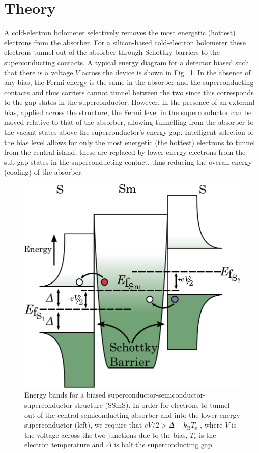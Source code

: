 \documentclass[journal, a4paper]{IEEEtran}
\begin{document}
\section{Theory}
A cold-electron bolometer selectively removes the most energetic (hottest) electrons from the absorber. For a silicon-based cold-electron bolometer these electrons tunnel out of the absorber through Schottky barriers to the superconducting contacts. A typical energy diagram for a detector biased such that there is a voltage $V$ across the device is shown in Fig.~\ref{fig:CEBenergy}.  In the absence of any bias, the Fermi energy is the same in the absorber and the superconducting contacts and thus carriers cannot tunnel between the two since this corresponds to the gap states in the superconductor. However, in the presence of an external bias, applied across the structure, the Fermi level in the superconductor can be moved relative to that of the absorber, allowing tunnelling from the absorber to the vacant states above the superconductor's energy gap. Intelligent selection of the bias level allows for only the most energetic (the hottest) electrons to tunnel from the
\newpage \noindent
central island, these are replaced by lower-energy electrons from the sub-gap states in the superconducting contact, thus reducing the overall energy (cooling) of the absorber. 
\begin{figure}[tb]
\centering 
\includegraphics[width = 0.65\columnwidth]{CEB_energyLevels_bias}
\caption{Energy bands for a biased superconductor-semiconductor-superconductor structure (SSmS). In order for electrons to tunnel out of the central semiconducting absorber and into the lower-energy superconductor (left), we require that  $eV/2 > \varDelta - k_{\mathrm{B}}T_{\mathrm{e}}$ , where $V$  is the voltage across the two junctions due to the bias, $T_{\mathrm{e}}$ is the electron temperature and $\varDelta $ is half the superconducting gap.}
\label{fig:CEBenergy}
\end{figure}
\end{document}
